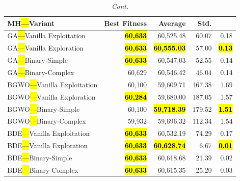 \documentclass[mathematics,article,accept,moreauthors]{Definitions/mdpi}
\begin{document}
\begin{table}[H]\ContinuedFloat
\caption{\textit{Cont.}}
  \small
  \label{tab:calidad_mknapcb4_29}
  \begin{tabularx}{\textwidth}{lRRRR}
    \toprule
    \textbf{MH\hl{---}Variant} &
    \textbf{Best Fitness} &
    \textbf{Average} &
    \textbf{Std.} &
    \textbf{} \\
    \midrule



    GA\hl{---}Vanilla Exploitation   & \textbf{\hl{60,633}} &         60,525.48 &  60.07 &         0.18 \\
    GA\hl{---}Vanilla Exploration    & \textbf{\hl{60,633}} & \textbf{\hl{60,555.03}} &  57.00 & \textbf{\hl{0.13}} \\
    GA\hl{---}Binary-Simple          & \textbf{\hl{60,633}} &         60,547.03 &  52.55 &         0.14 \\
    GA\hl{---}Binary-Complex         &          60,629 &         60,546.42 &  46.04 &         0.14 \\
    \midrule
    BGWO\hl{---}Vanilla Exploitation &          60,100 &         59,609.71 & 167.38 &         1.69 \\
    BGWO\hl{---}Vanilla Exploration  & \textbf{\hl{60,284}} &         59,680.00 & 187.05 &         1.57 \\
    BGWO\hl{---}Binary-Simple        &          60,100 & \textbf{\hl{59,718.39}} & 179.52 & \textbf{\hl{1.51}} \\
    BGWO\hl{---}Binary-Complex       &          59,932 &         59,696.32 & 112.34 &         1.54 \\
    \midrule
    BDE\hl{---}Vanilla Exploitation  & \textbf{\hl{60,633}} &         60,532.19 &  74.29 &         0.17 \\
    BDE\hl{---}Vanilla Exploration   & \textbf{\hl{60,633}} & \textbf{\hl{60,628.74}} &   6.67 & \textbf{\hl{0.01}} \\
    BDE\hl{---}Binary-Simple         & \textbf{\hl{60,633}} &         60,618.68 &  21.39 &         0.02 \\
    BDE\hl{---}Binary-Complex        & \textbf{\hl{60,633}} &         60,615.35 &  25.20 &         0.03 \\
    \bottomrule
  \end{tabularx}
\end{table}

\end{document}
